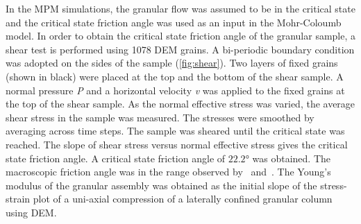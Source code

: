In the MPM simulations, the granular flow was assumed to be in the critical 
state and the critical state friction angle was used as an input in the 
Mohr-Coloumb model. In order to obtain the critical state friction angle of the 
granular sample, a shear test is performed using 1078 DEM grains. A 
bi-periodic boundary condition was adopted on the sides of the sample 
(\cref{fig:shear}). Two layers of fixed grains (shown in black) were placed at 
the top and the bottom of the shear sample. A normal pressure \textit{P} and a 
horizontal velocity \textit{v} was applied to the fixed grains at the top of 
the shear sample. As the normal effective stress was varied, the average shear 
stress in the sample was measured. The stresses were smoothed by averaging 
across time steps. The sample was sheared until the critical state was reached. 
The slope of shear stress versus normal effective stress gives the critical 
state friction angle. A critical state friction angle of $22.2$\si{\degree} was 
obtained. The macroscopic friction angle was in the range observed 
by~\citet{Estrada2008} and~\citet{Mitchell2005}. The Young's modulus of the 
granular assembly was obtained as the initial slope of the stress-strain plot 
of a uni-axial compression of a laterally confined granular column using DEM.

